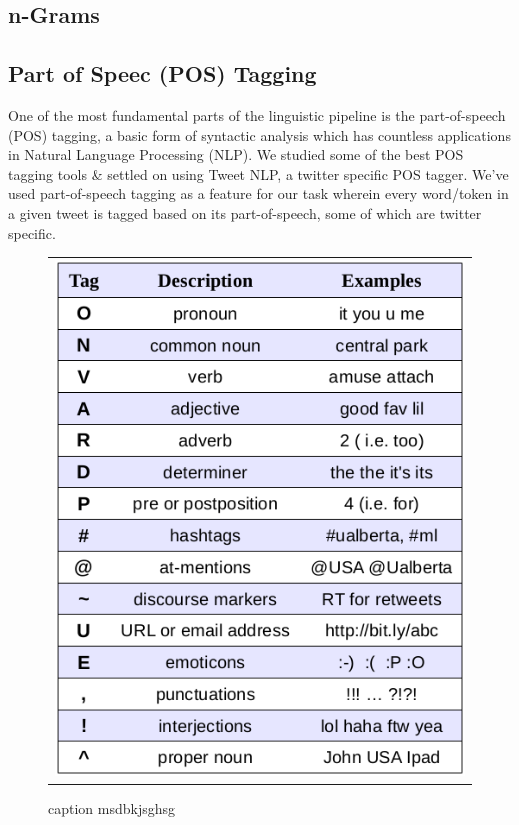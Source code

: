 \subsection{n-Grams} %
\label{sub:n_grams}


\subsection{Part of Speec (POS) Tagging} %
\label{sub:part_of_speec_}

One of the most fundamental parts of the linguistic pipeline is the part-of-speech (POS) tagging, a basic form of syntactic analysis which has countless applications in Natural Language Processing (NLP). We studied some of the best POS tagging tools \& settled on using Tweet NLP, a twitter specific POS tagger. We’ve used part-of-speech tagging as a feature for our task wherein every word/token in a given tweet is tagged based on its part-of-speech, some of which are twitter specific.

\begin{figure}[ht]
\centering 
  \begin{tabular}{@{}l@{}}
    \includegraphics[width=0.4\linewidth]{img/tags-final.png}
  \end{tabular} 
  \caption{caption msdbkjsghsg} 
  \label{fig:tags_final} 
\end{figure}

